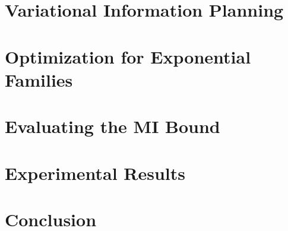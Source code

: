 \documentclass[twoside]{article}
\begin{document}
\section{Variational Information Planning}


\section{Optimization for Exponential Families}\label{sec:optim}


\section{Evaluating the MI Bound}


\section{Experimental Results}\label{sec:experiments}


\section{Conclusion}




\end{document}
